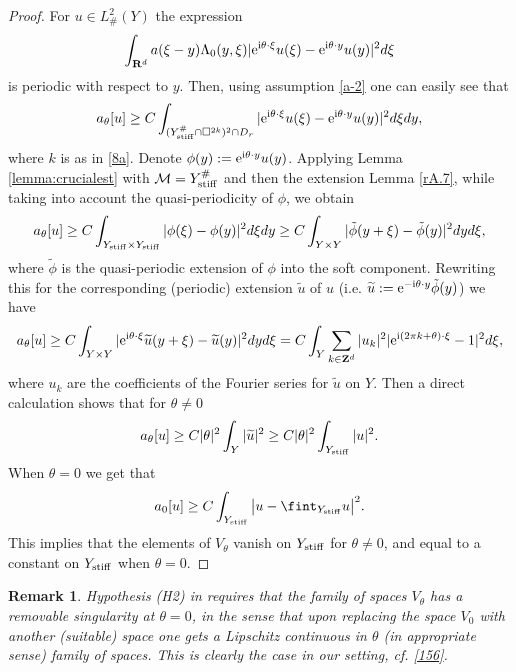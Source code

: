 \documentclass[11pt]{article}
\newcommand\stiff{{\rm stiff}}
\def\rme{{\rm e}}
\def\rmi{{\rm i}}
\newcommand{\R}{\mathbf{R}}
\def\M{\mathcal{M}}
\newcommand\Z{\mathbf{Z}}
\newtheorem{remark}[theorem]{Remark}
\theoremstyle{remark}
\begin{document}
\begin{proof}
For $u\in L^2_\#(Y)$ the expression 
\begin{equation*}
	\int_{\R^d} a(\xi - y) \Lambda_0(y,\xi) |\rme^{\rmi \theta\cdot\xi } u(\xi)-\rme^{\rmi \theta\cdot y}u(y)|^2 d\xi 
\end{equation*} 
is periodic with respect to $y$. Then, using assumption \eqref{a-2}  one can easily see that 
\begin{equation*}
	a_\theta[u] \geq C \int_{(Y_\stiff^\#\cap \square^{2k})^2 \cap D_r} |\rme^{\rmi \theta\cdot\xi } u(\xi)-\rme^{\rmi \theta\cdot y}u(y)|^2d\xi dy,
\end{equation*}
where $k$ is as in \eqref{8a}.
Denote  $\phi(y) : = \rme^{\rmi \theta\cdot y}u(y)$. Applying Lemma \ref{lemma:crucialest} with $\M = Y_\stiff^\#$  and then the extension Lemma \ref{rA.7}, while taking into account the quasi-periodicity of $\phi$, we obtain 
\begin{equation*}
	a_\theta[u] \geq C  \int_{Y_\stiff\times Y_\stiff}  |\phi(\xi)- \phi(y)|^2d\xi dy  \geq C \int_{Y\times Y}|\tilde\phi(y+\xi)- \tilde\phi(y)|^2 dy d\xi,
\end{equation*}
where $\tilde \phi$ is the quasi-periodic extension of $\phi$ into the soft component.
Rewriting this for the corresponding (periodic) extension $\widetilde u$ of $u$ (i.e. $\widetilde u : = \rme^{- \rmi \theta\cdot y} \tilde\phi(y)$) we have
\begin{equation*}
	a_\theta[u] \geq C \int_{Y\times Y}|\rme^{\rmi \theta\cdot\xi } \widetilde u(y+\xi)-\widetilde u(y)|^2 dy d\xi = C \int_{Y}  \sum_{k\in\Z^d} |u_k|^2|\rme^{\rmi (2\pi k + \theta)\cdot \xi } -1|^2 d\xi,
\end{equation*}
where $u_k$  are the coefficients of the Fourier series for $\widetilde u$ on $Y$. Then a direct calculation shows that for $\theta \neq 0$
\begin{equation}\label{76}
	a_\theta[u] \geq C |\theta|^2  \int_{Y}|\widetilde u|^2 \geq C |\theta|^2  \int_{Y_\stiff}|u|^2.
\end{equation}
 When $\theta = 0$ we get that
\begin{equation}\label{77}
	a_0[u] \geq  C   \int_{Y_\stiff}\big|u - \fint_{Y_\stiff} u \big|^2.
\end{equation}
This implies that the elements of $V_\theta$ vanish on $Y_\stiff$ for $\theta \neq 0$, and equal to a constant  on $Y_\stiff$  when $ \theta = 0$.
\end{proof}

\begin{remark}
Hypothesis (H2) in \cite{CCV23} requires that the family of spaces $V_\theta$ has a removable singularity at $\theta = 0$, in the sense that upon replacing the space $V_0$ with another (suitable) space one gets a Lipschitz continuous in $\theta$ (in appropriate sense) family of spaces. This is clearly the case in our setting, cf. \eqref{156}.
\end{remark}
\end{document}
